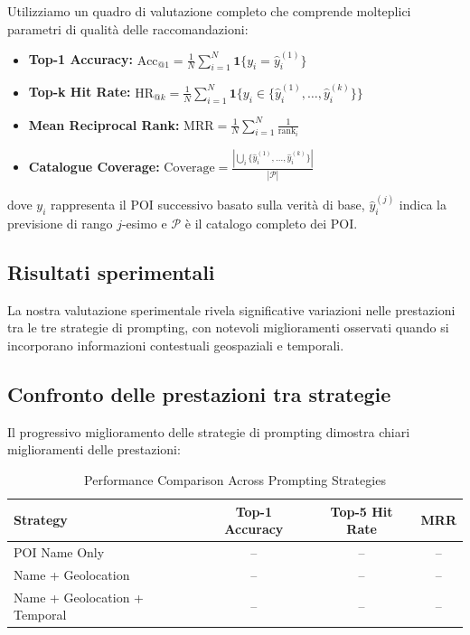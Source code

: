 \documentclass[12pt,a4paper]{article}
\begin{document}
Utilizziamo un quadro di valutazione completo che comprende molteplici parametri di qualità delle raccomandazioni:

\begin{itemize}
\item \textbf{Top-1 Accuracy:} $\text{Acc}_{@1} = \frac{1}{N}\sum_{i=1}^{N}\mathbf{1}\{y_i = \hat{y}_i^{(1)}\}$
\item \textbf{Top-k Hit Rate:} $\text{HR}_{@k} = \frac{1}{N}\sum_{i=1}^{N}\mathbf{1}\{y_i \in \{\hat{y}_i^{(1)}, \ldots, \hat{y}_i^{(k)}\}\}$
\item \textbf{Mean Reciprocal Rank:} $\text{MRR} = \frac{1}{N}\sum_{i=1}^{N}\frac{1}{\text{rank}_i}$
\item \textbf{Catalogue Coverage:} $\text{Coverage} = \frac{|\bigcup_{i}\{\hat{y}_i^{(1)}, \ldots, \hat{y}_i^{(k)}\}|}{|\mathcal{P}|}$
\end{itemize}

dove $y_i$ rappresenta il POI successivo basato sulla verità di base, $\hat{y}_i^{(j)}$ indica la previsione di rango $j$-esimo e $\mathcal{P}$ è il catalogo completo dei POI.

\subsection{Risultati sperimentali}

La nostra valutazione sperimentale rivela significative variazioni nelle prestazioni tra le tre strategie di prompting, con notevoli miglioramenti osservati quando si incorporano informazioni contestuali geospaziali e temporali.

\subsection{Confronto delle prestazioni tra strategie}

Il progressivo miglioramento delle strategie di prompting dimostra chiari miglioramenti delle prestazioni:

\begin{table}[h]
\centering
\caption{Performance Comparison Across Prompting Strategies}
\label{tab:strategy_comparison}
\begin{tabular}{lccc}
\toprule
\textbf{Strategy} & \textbf{Top-1 Accuracy} & \textbf{Top-5 Hit Rate} & \textbf{MRR} \\
\midrule
POI Name Only & -- & -- & -- \\
Name + Geolocation & -- & -- & -- \\
Name + Geolocation + Temporal & -- & -- & -- \\
\bottomrule
\end{tabular}
\end{table}
\end{document}
